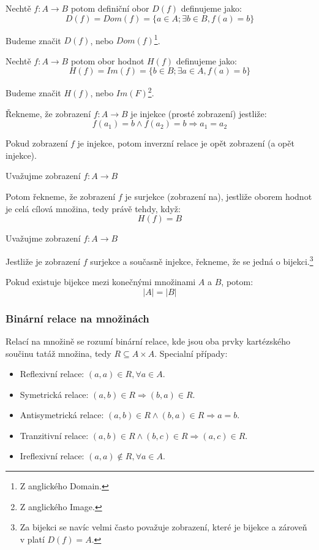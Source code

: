 \begin{definition}
	Nechtě $f: A \rightarrow B$ potom definiční obor $D(f)$ definujeme jako:
	$$D(f) = Dom(f) = \{a \in A; \exists b \in B, f(a) = b\}$$

	Budeme značit $D(f)$, nebo $Dom(f)$\footnote{Z anglického Domain.}.
\end{definition}

\begin{definition}
	Nechtě $f: A \rightarrow B$ potom obor hodnot $H(f)$ definujeme jako:
	$$H(f) = Im(f) = \{b \in B; \exists a \in A, f(a) = b\}$$

	Budeme značit $H(f)$, nebo $Im(F)$\footnote{Z anglického Image.}.
\end{definition}

\begin{definition}
	Řekneme, že zobrazení $f: A \rightarrow B$ je injekce (prosté zobrazení)
	jestliže: $$f(a_1) = b \wedge f(a_2) = b \Rightarrow a_1 = a_2$$

	Pokud zobrazení $f$ je injekce,
	potom inverzní relace je opět zobrazení (a opět injekce).
\end{definition}

\begin{definition}[Surjekce]
	Uvažujme zobrazení $f: A \rightarrow B$

	Potom řekneme, že zobrazení $f$ je surjekce (zobrazení na),
	jestliže oborem hodnot je celá cílová množina, tedy právě tehdy, když:
	$$H(f) = B$$
\end{definition}

\begin{definition}[Bijekce]
	Uvažujme zobrazení $f: A \rightarrow B$

	Jestliže je zobrazení $f$ surjekce a současně injekce,
	řekneme, že se jedná o bijekci.\footnote{Za bijekci se navíc velmi
	často považuje zobrazení, které je bijekce a zároveň v platí $D(f) = A$.}

	Pokud existuje bijekce mezi konečnými množinami $A$ a $B$, potom:
	$$|A| = |B|$$
\end{definition}

\subsubsection*{Binární relace na množinách}
Relací na množině se rozumí binární relace, kde jsou oba prvky kartézského součinu tatáž
množina, tedy $R \subseteq A \times A$.
Specialní případy:
\begin{itemize}
	\item Reflexivní relace: $(a, a) \in R, \forall a \in A$.
	\item Symetrická relace: $(a, b) \in R \Rightarrow (b, a) \in R$.
	\item Antisymetrická relace: $(a, b) \in R \wedge (b, a) \in R \Rightarrow a = b$.
	\item Tranzitivní relace: $(a, b) \in R \wedge (b, c) \in R \Rightarrow (a, c) \in R$.
	\item Ireflexivní relace: $(a, a) \notin R, \forall a \in A$.
\end{itemize}

